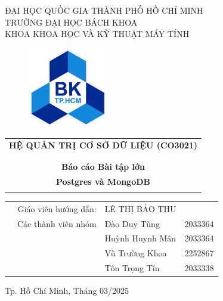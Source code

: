 \documentclass{article}
\begin{document}
\lstset{style=myStyle}
\begin{titlepage}
\begin{center}
    \large ĐẠI HỌC QUỐC GIA THÀNH PHỐ HỒ CHÍ MINH \\
    TRƯỜNG ĐẠI HỌC BÁCH KHOA \\
    KHOA KHOA HỌC VÀ KỸ THUẬT MÁY TÍNH
\end{center}

\vspace{1.5cm}

\begin{figure}[!ht]
    \centering \includegraphics[width=3.5cm]{Images/bachkhoa_logo.png}
\end{figure}

\begin{table}[H]
    \centering
    \begin{tabular}{c}
    {\bf \Large HỆ QUẢN TRỊ CƠ SỞ DỮ LIỆU (CO3021)} \\ \\
    \hline  \\
    \multicolumn{0}{c}{{\bf \huge Báo cáo Bài tập lớn}} \\
    {\bf \huge Postgres và MongoDB}     \\  
    \\
    \hline
    \end{tabular}
\end{table}

\begin{table}[h]
\centering
\begin{tabular}{lrlc}

\hspace{5 cm} & Giáo viên hướng dẫn: & LÊ THỊ BẢO THU\\
& Các thành viên nhóm &  
 	
    Đào Duy Tùng& 2033364\\
& & Huỳnh Huynh Mân & 2033364\\
& & Vũ Trường Khoa& 2252867\\
& & Tôn Trọng Tín & 2033338\\
\end{tabular}
\textbf{\textit{}}\end{table}

\vspace{1.0cm}

\begin{center}
    \footnotesize Tp. Hồ Chí Minh, Tháng 03/2025
\end{center}
\end{titlepage}
\newpage
\end{document}
